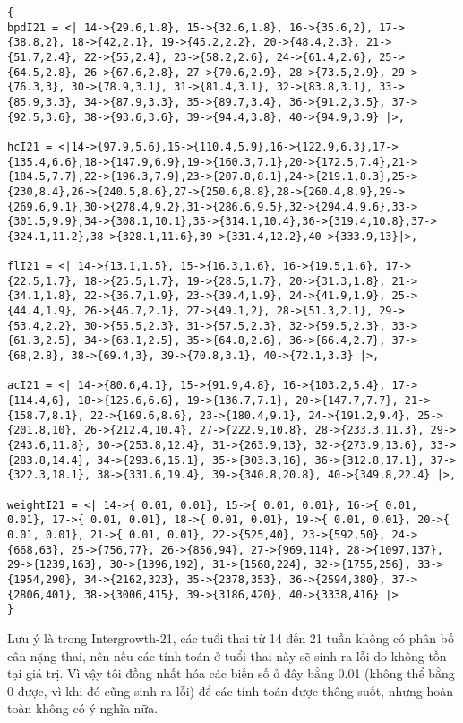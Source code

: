 \documentclass[11pt]{article}
\begin{document}
\begin{verbatim}
{
bpdI21 = <| 14->{29.6,1.8}, 15->{32.6,1.8}, 16->{35.6,2}, 17->{38.8,2}, 18->{42,2.1}, 19->{45.2,2.2}, 20->{48.4,2.3}, 21->{51.7,2.4}, 22->{55,2.4}, 23->{58.2,2.6}, 24->{61.4,2.6}, 25->{64.5,2.8}, 26->{67.6,2.8}, 27->{70.6,2.9}, 28->{73.5,2.9}, 29->{76.3,3}, 30->{78.9,3.1}, 31->{81.4,3.1}, 32->{83.8,3.1}, 33->{85.9,3.3}, 34->{87.9,3.3}, 35->{89.7,3.4}, 36->{91.2,3.5}, 37->{92.5,3.6}, 38->{93.6,3.6}, 39->{94.4,3.8}, 40->{94.9,3.9} |>,

hcI21 = <|14->{97.9,5.6},15->{110.4,5.9},16->{122.9,6.3},17->{135.4,6.6},18->{147.9,6.9},19->{160.3,7.1},20->{172.5,7.4},21->{184.5,7.7},22->{196.3,7.9},23->{207.8,8.1},24->{219.1,8.3},25->{230,8.4},26->{240.5,8.6},27->{250.6,8.8},28->{260.4,8.9},29->{269.6,9.1},30->{278.4,9.2},31->{286.6,9.5},32->{294.4,9.6},33->{301.5,9.9},34->{308.1,10.1},35->{314.1,10.4},36->{319.4,10.8},37->{324.1,11.2},38->{328.1,11.6},39->{331.4,12.2},40->{333.9,13}|>,

flI21 = <| 14->{13.1,1.5}, 15->{16.3,1.6}, 16->{19.5,1.6}, 17->{22.5,1.7}, 18->{25.5,1.7}, 19->{28.5,1.7}, 20->{31.3,1.8}, 21->{34.1,1.8}, 22->{36.7,1.9}, 23->{39.4,1.9}, 24->{41.9,1.9}, 25->{44.4,1.9}, 26->{46.7,2.1}, 27->{49.1,2}, 28->{51.3,2.1}, 29->{53.4,2.2}, 30->{55.5,2.3}, 31->{57.5,2.3}, 32->{59.5,2.3}, 33->{61.3,2.5}, 34->{63.1,2.5}, 35->{64.8,2.6}, 36->{66.4,2.7}, 37->{68,2.8}, 38->{69.4,3}, 39->{70.8,3.1}, 40->{72.1,3.3} |>,

acI21 = <| 14->{80.6,4.1}, 15->{91.9,4.8}, 16->{103.2,5.4}, 17->{114.4,6}, 18->{125.6,6.6}, 19->{136.7,7.1}, 20->{147.7,7.7}, 21->{158.7,8.1}, 22->{169.6,8.6}, 23->{180.4,9.1}, 24->{191.2,9.4}, 25->{201.8,10}, 26->{212.4,10.4}, 27->{222.9,10.8}, 28->{233.3,11.3}, 29->{243.6,11.8}, 30->{253.8,12.4}, 31->{263.9,13}, 32->{273.9,13.6}, 33->{283.8,14.4}, 34->{293.6,15.1}, 35->{303.3,16}, 36->{312.8,17.1}, 37->{322.3,18.1}, 38->{331.6,19.4}, 39->{340.8,20.8}, 40->{349.8,22.4} |>,

weightI21 = <| 14->{ 0.01, 0.01}, 15->{ 0.01, 0.01}, 16->{ 0.01, 0.01}, 17->{ 0.01, 0.01}, 18->{ 0.01, 0.01}, 19->{ 0.01, 0.01}, 20->{ 0.01, 0.01}, 21->{ 0.01, 0.01}, 22->{525,40}, 23->{592,50}, 24->{668,63}, 25->{756,77}, 26->{856,94}, 27->{969,114}, 28->{1097,137}, 29->{1239,163}, 30->{1396,192}, 31->{1568,224}, 32->{1755,256}, 33->{1954,290}, 34->{2162,323}, 35->{2378,353}, 36->{2594,380}, 37->{2806,401}, 38->{3006,415}, 39->{3186,420}, 40->{3338,416} |>
}
\end{verbatim}

Lưu ý là trong Intergrowth-21, các tuổi thai từ 14 đến 21 tuần không có phân bố cân nặng thai, nên nếu các tính toán ở tuổi thai này sẽ sinh ra lỗi do không tồn tại giá trị. Vì vậy tôi đồng nhất hóa các biến số ở đây bằng 0.01 (không thể bằng 0 được, vì khi đó cũng sinh ra lỗi) để các tính toán được thông suốt, nhưng hoàn toàn không có ý nghĩa nữa.
\end{document}
